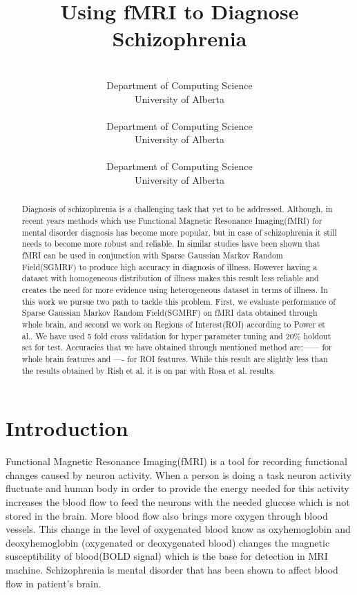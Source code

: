 \documentclass{article} %
\title{Using fMRI to Diagnose Schizophrenia}
\author{%
	\\
	Department of Computing Science\\
	University of Alberta\\
	\texttt{} 
\And 
 \\
Department of Computing Science\\
University of Alberta\\
\texttt{}
\And 
\\
Department of Computing Science\\
University of Alberta\\
\texttt{}  
}
\begin{document}
	\maketitle
	\begin{abstract}
			Diagnosis of schizophrenia is a challenging task that yet to be addressed\cite{McGuire200891}. Although, in recent years methods which use Functional Magnetic Resonance Imaging(fMRI) for mental disorder diagnosis has become more popular, but in case of schizophrenia it still needs to become more robust and reliable. In similar studies\cite{Rish_2013}\cite{Rosa_2013} have been shown that fMRI can be used in conjunction with Sparse Gaussian Markov Random Field(SGMRF) to produce high accuracy in diagnosis of illness. However having a dataset with homogeneous distribution of illness makes this result less reliable and creates the need for more evidence using heterogeneous dataset in terms of illness. In this work we pursue two path to tackle this problem. First, we evaluate performance of Sparse Gaussian Markov Random Field(SGMRF) on fMRI data obtained through whole brain, and second we work on Regions of Interest(ROI) according to Power et al.\cite{Power_2011}. We have used 5 fold cross validation for hyper parameter tuning and 20\% holdout set for test. Accuracies that we have obtained through mentioned method are:------ for whole brain features and ---- for ROI features. While this result are slightly less than the results obtained by Rish et al. it is on par with Rosa et al. results.  
	\end{abstract}
	\section{Introduction}
	Functional Magnetic Resonance Imaging(fMRI) is a tool for recording functional changes caused by neuron activity. When a person is doing a task neuron activity fluctuate and human body in order to provide the energy needed for this activity increases the blood flow to feed the neurons with the needed glucose which is not stored in the brain. More blood flow also brings more oxygen through blood vessels. This change in the level of oxygenated blood know as oxyhemoglobin and deoxyhemoglobin (oxygenated or deoxygenated blood) changes the magnetic susceptibility of blood(BOLD signal) which is the base for detection in MRI machine.  
	Schizophrenia is mental disorder that has been shown to affect blood flow in patient's brain\cite{Kenji_2010}.   
  
	
	
	
	
\end{document}
